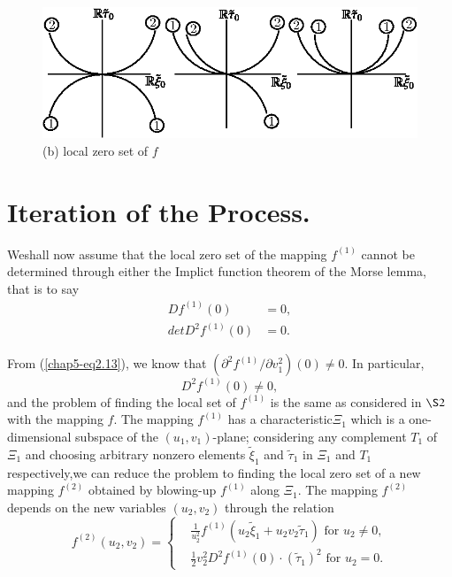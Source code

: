 \setcounter{figure}{1}
\begin{figure}[H]
\centering
\includegraphics{figure/fig76-4.2b.eps}
\caption{(b) local zero set of $f$}
\end{figure}


\section{Iteration of the Process.}\label{chap5-sec5}

We\pageoriginale shall now assume that the local zero set of the
mapping $f^{(1)}$ cannot be determined through either the Implict
function theorem of the Morse lemma, that is to say
\begin{align*}
Df^{(1)} (0) & = 0,\tag{5.1}\label{chap5-eq5.1}\\
det D^{2}f^{(1)}(0) & = 0.\tag{5.2}\label{chap5-eq5.2} 
\end{align*}

From (\ref{chap5-eq2.13}), we know that $(\partial^{2}f^{(1)} /
\partial v_{1}^{2}) (0) \neq 0$. In particular,
\begin{equation*}
D^{2}f^{(1)}(0) \neq 0,\tag{5.3}\label{chap5-eq5.3}
\end{equation*}
and the problem of finding the local set of $f^{(1)}$ is the same as
considered in $\S 2$ with the mapping $f$. The mapping $f^{(1)}$ has a
characteristic\pageoriginale  $\Xi_{1}$ which is a one-dimensional subspace of the
$(u_{1}, v_{1})$-plane; considering any complement $T_{1}$ of
$\Xi_{1}$ and choosing arbitrary nonzero elements
$\widetilde{\xi}_{1}$ and $\widetilde{\tau}_{1}$ in $\Xi_{1}$ and
$T_{1}$ respectively,we can reduce the problem to finding the local
zero set of a new mapping $f^{(2)}$ obtained by blowing-up $f^{(1)}$
along $\Xi_{1}$. The mapping $f^{(2)}$ depends on the new variables
$(u_{2}, v_{2})$ through the relation
\begin{equation*}
f^{(2)} (u_{2}, v_{2}) = 
\begin{cases}
& \frac{1}{u_{2}^{2}} f^{(1)} (u_{2}\widetilde{\xi}_{1} + u_{2}v_{2}
\widetilde{\tau}_{1}) \text{ for } u_{2} \neq 0,\\
& \frac{1}{2} v_{2}^{2}D^{2} f^{(1)} (0) \cdot
(\widetilde{\tau}_{1})^{2} \text{ for } u_{2} = 0.
\end{cases}
\end{equation*}

